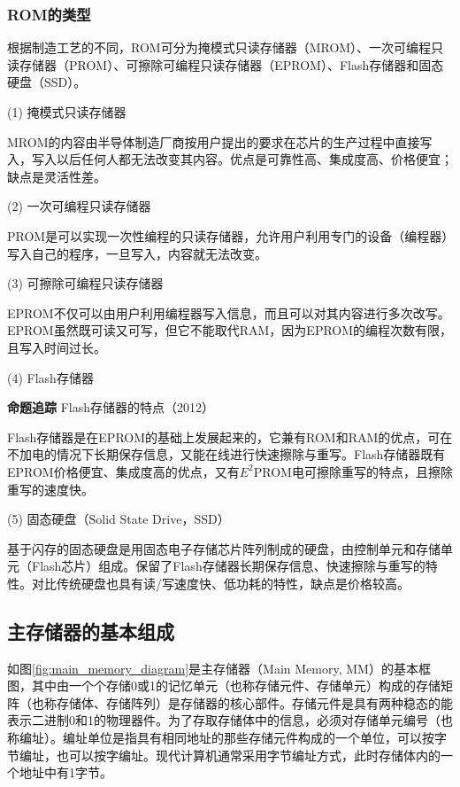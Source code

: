 \documentclass[UTF8]{ctexart}
\begin{document}
	\subsubsection{ROM的类型}
	根据制造工艺的不同，ROM可分为掩模式只读存储器（MROM）、一次可编程只读存储器（PROM）、可擦除可编程只读存储器（EPROM）、Flash存储器和固态硬盘（SSD）。
	
	(1) 掩模式只读存储器
		
	MROM的内容由半导体制造厂商按用户提出的要求在芯片的生产过程中直接写入，写入以后任何人都无法改变其内容。优点是可靠性高、集成度高、价格便宜；缺点是灵活性差。
	
	(2) 一次可编程只读存储器
	
	PROM是可以实现一次性编程的只读存储器，允许用户利用专门的设备（编程器）写入自己的程序，一旦写入，内容就无法改变。
	
	(3) 可擦除可编程只读存储器
	
	EPROM不仅可以由用户利用编程器写入信息，而且可以对其内容进行多次改写。EPROM虽然既可读又可写，但它不能取代RAM，因为EPROM的编程次数有限，且写入时间过长。
	
	(4) Flash存储器
	
	\begin{tcolorbox}[colframe=black, colback=white]
		\kaishu \textbf{命题追踪} \quad Flash存储器的特点（2012）
	\end{tcolorbox}
	Flash存储器是在EPROM的基础上发展起来的，它兼有ROM和RAM的优点，可在不加电的情况下长期保存信息，又能在线进行快速擦除与重写。Flash存储器既有EPROM价格便宜、集成度高的优点，又有$E^2$PROM电可擦除重写的特点，且擦除重写的速度快。
	
	(5) 固态硬盘（Solid State Drive，SSD）
	
	基于闪存的固态硬盘是用固态电子存储芯片阵列制成的硬盘，由控制单元和存储单元（Flash芯片）组成。保留了Flash存储器长期保存信息、快速擦除与重写的特性。对比传统硬盘也具有读/写速度快、低功耗的特性，缺点是价格较高。
	
	\subsection{主存储器的基本组成}
	如图\ref{fig:main_memory_diagram}是主存储器（Main Memory, MM）的基本框图，其中由一个个存储0或1的记忆单元（也称存储元件、存储单元）构成的存储矩阵（也称存储体、存储阵列）是存储器的核心部件。存储元件是具有两种稳态的能表示二进制0和1的物理器件。为了存取存储体中的信息，必须对存储单元编号（也称编址）。编址单位是指具有相同地址的那些存储元件构成的一个单位，可以按字节编址，也可以按字编址。现代计算机通常采用字节编址方式，此时存储体内的一个地址中有1字节。
	
\end{document}
